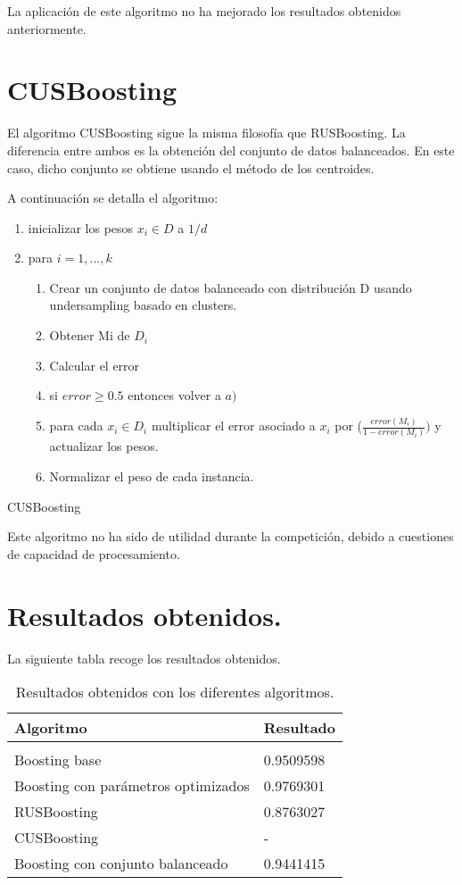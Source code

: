 La aplicación de este algoritmo no ha mejorado los resultados obtenidos anteriormente.

\section{CUSBoosting}
El algoritmo CUSBoosting sigue la misma filosofía que RUSBoosting. La diferencia entre ambos es la obtención del conjunto de datos balanceados. En este caso, dicho conjunto se obtiene usando el método de los centroides.
\medskip

A continuación se detalla el algoritmo:

\begin{algorithm}
	\begin{enumerate}
		\item inicializar los pesos $x_i \in D$ a $1/d$
		\item para $i=1,...,k$
		\begin{enumerate}
			\item Crear un conjunto de datos balanceado con distribución D usando
			undersampling basado en clusters.
			\item Obtener Mi de $D_i$
			\item Calcular el error 
			\item si $error\geq 0.5$ entonces volver a $a)$
			\item para cada $x_i\in D_i$ multiplicar el error asociado a $x_i$ por
			($\frac{error(M_i)}{1-error(M_i)})$ y actualizar los pesos.
			\item Normalizar el peso de cada instancia.  
		\end{enumerate}
	\end{enumerate}
	\caption{CUSBoosting}
\end{algorithm}

Este algoritmo no ha sido de utilidad durante la competición, debido a cuestiones de capacidad de procesamiento.


 
\section{Resultados obtenidos.}
La siguiente tabla recoge los resultados obtenidos.
\begin{table}[H]
	\centering
	\begin{tabular}{ll}
		\textbf{Algoritmo}& \textbf{Resultado} \\
		\hline
		\\
		Boosting base&    0.9509598  \\
		Boosting con parámetros optimizados& 0.9769301 \\
		RUSBoosting & 0.8763027 \\
		CUSBoosting &  -  \\
		Boosting con conjunto balanceado & 0.9441415  \\
	\end{tabular}
	\caption{Resultados obtenidos con los diferentes algoritmos.}
\end{table}
